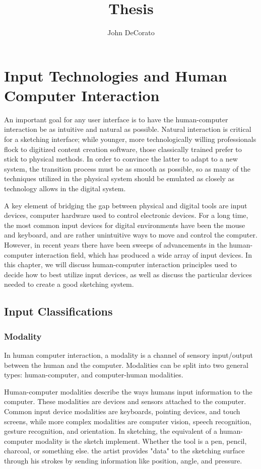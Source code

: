 \documentclass[11pt]{report}
\title{Thesis}
\author{John DeCorato}
\date{ }
\begin{document}
\chapter{Input Technologies and Human Computer Interaction}

An important goal for any user interface is to have the human-computer interaction be as intuitive and natural as possible.
Natural interaction is critical for a sketching interface; while younger, more technologically willing professionals flock to digitized content creation software, those classically trained prefer to stick to physical methods.
In order to convince the latter to adapt to a new system, the transition process must be as smooth as possible, so as many of the techniques utilized in the physical system should be emulated as closely as technology allows in the digital system.

A key element of bridging the gap between physical and digital tools are input devices, computer hardware used to control electronic devices.
For a long time, the most common input devices for digital environments have been the mouse and keyboard, and are rather unintuitive ways to move and control the computer.
However, in recent years there have been sweeps of advancements in the human-computer interaction field, which has produced a wide array of input devices.
In this chapter, we will discuss human-computer interaction principles used to decide how to best utilize input devices, as well as discuss the particular devices needed to create a good sketching system.



\section{Input Classifications}

\subsection{Modality}

In human computer interaction, a modality is a channel of sensory input/output between the human and the computer. Modalities can be split into two general types: human-computer, and computer-human modalities.

Human-computer modalities describe the ways humans input information to the computer.
These modalities are devices and sensors attached to the computer.
Common input device modalities are keyboards, pointing devices, and touch screens, while more complex modalities are computer vision, speech recognition, gesture recognition, and orientation.
In sketching, the equivalent of a human-computer modality is the sketch implement. 
Whether the tool is a pen, pencil, charcoal, or something else. the artist provides "data" to the sketching surface through his strokes by sending information like position, angle, and pressure.
\end{document}
